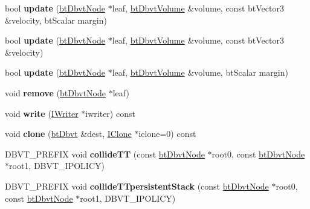 \begin{DoxyCompactItemize}
bool {\bfseries update} (\hyperlink{structbtDbvtNode}{bt\+Dbvt\+Node} $\ast$leaf, \hyperlink{structbtDbvtAabbMm}{bt\+Dbvt\+Volume} \&volume, const bt\+Vector3 \&velocity, bt\+Scalar margin)
\item 
\mbox{\label{structbtDbvt_ac4ec3a1dec7bc12e0803159a6d53e4b3}} 
bool {\bfseries update} (\hyperlink{structbtDbvtNode}{bt\+Dbvt\+Node} $\ast$leaf, \hyperlink{structbtDbvtAabbMm}{bt\+Dbvt\+Volume} \&volume, const bt\+Vector3 \&velocity)
\item 
\mbox{\label{structbtDbvt_a0f6e436b7a7dd41d1ea1b732b26f0a5c}} 
bool {\bfseries update} (\hyperlink{structbtDbvtNode}{bt\+Dbvt\+Node} $\ast$leaf, \hyperlink{structbtDbvtAabbMm}{bt\+Dbvt\+Volume} \&volume, bt\+Scalar margin)
\item 
\mbox{\label{structbtDbvt_ae01b804da6734f4ce250f6fe7ef0b5fb}} 
void {\bfseries remove} (\hyperlink{structbtDbvtNode}{bt\+Dbvt\+Node} $\ast$leaf)
\item 
\mbox{\label{structbtDbvt_a528b672e2aa8cbadb66943344bda6c2f}} 
void {\bfseries write} (\hyperlink{structbtDbvt_1_1IWriter}{I\+Writer} $\ast$iwriter) const
\item 
\mbox{\label{structbtDbvt_a8b6290efeae54596751fd11cc22a7dba}} 
void {\bfseries clone} (\hyperlink{structbtDbvt}{bt\+Dbvt} \&dest, \hyperlink{structbtDbvt_1_1IClone}{I\+Clone} $\ast$iclone=0) const
\item 
\mbox{\label{structbtDbvt_aeb3be68be0d863b1534996676a2aa416}} 
D\+B\+V\+T\+\_\+\+P\+R\+E\+F\+IX void {\bfseries collide\+TT} (const \hyperlink{structbtDbvtNode}{bt\+Dbvt\+Node} $\ast$root0, const \hyperlink{structbtDbvtNode}{bt\+Dbvt\+Node} $\ast$root1, D\+B\+V\+T\+\_\+\+I\+P\+O\+L\+I\+CY)
\item 
\mbox{\label{structbtDbvt_ad42b74ec72d83f4de65e1e78ad5bc012}} 
D\+B\+V\+T\+\_\+\+P\+R\+E\+F\+IX void {\bfseries collide\+T\+Tpersistent\+Stack} (const \hyperlink{structbtDbvtNode}{bt\+Dbvt\+Node} $\ast$root0, const \hyperlink{structbtDbvtNode}{bt\+Dbvt\+Node} $\ast$root1, D\+B\+V\+T\+\_\+\+I\+P\+O\+L\+I\+CY)
\item 
\mbox{\label{structbtDbvt_a8418e9b4725f6e4ab73bbe4dbc4de7ea}} 

\end{DoxyCompactItemize}
